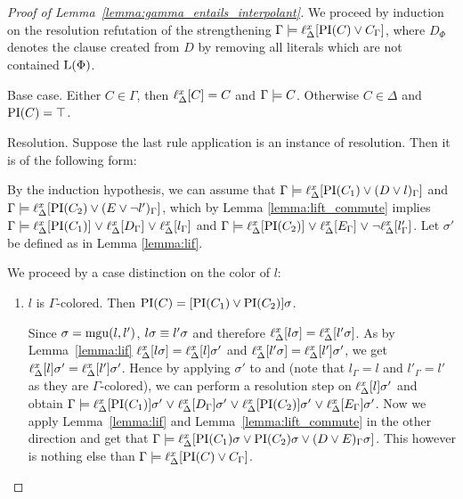 \begin{proof}[Proof of Lemma~\ref{lemma:gamma_entails_interpolant}]
	We proceed by induction on the resolution refutation of the strengthening $\Gamma \entails \lifdelta{\PI(C) \lor\nolinebreak C_\Gamma}$,
	where $D_\Phi$ denotes the clause created from $D$ by removing all literals which are not contained $\operatorname{L}(\Phi)$.

	\begin{description}
		\item{Base case.}
			Either $C \in \Gamma$, then $\ell_{\Delta}^{x}[C] = C$ and $\Gamma \models C$.
			Otherwise $C \in \Delta$ and $\operatorname{PI}(C) = \top$.

		\item{Resolution.}
			Suppose the last rule application is an instance of resolution. Then it is of the following form:
			\begin{prooftree}
			\end{prooftree}

			By the induction hypothesis, we can assume that
			$\Gamma \models \ell_{\Delta}^{x}[\operatorname{PI}(C_1) \lor (D\lor l)_\Gamma]$ and $\Gamma \models \ell_{\Delta}^{x}[\operatorname{PI}(C_2) \lor (E\lor \lnot l')_\Gamma]$,
			which by Lemma \ref{lemma:lift_commute} implies 
			\markA{} $\Gamma \models \ell_{\Delta}^{x}[\operatorname{PI}(C_1)] \;{\lor}\;\allowbreak \ell_{\Delta}^{x}[D_\Gamma] \;{\lor}\;\allowbreak \ell_{\Delta}^{x}[l_\Gamma]$ and \markB{} $\Gamma \models \ell_{\Delta}^{x}[\operatorname{PI}(C_2)] \;{\lor}\; \ell_{\Delta}^{x}[E_\Gamma] \;{\lor}\; \lnot \ell_{\Delta}^{x}[l'_\Gamma]$.
			Let $\sigma'$ be defined as in Lemma \ref{lemma:lif}.

			We proceed by a case distinction on the color of $l$:
			\begin{enumerate}
				\item $l$ is $\Gamma$-colored. Then $\operatorname{PI}(C) = [\operatorname{PI}(C_1) \lor \operatorname{PI}(C_2)]\sigma$.
					
					Since $\sigma = \operatorname{mgu}(l, l')$, $l\sigma \equiv l'\sigma$ and therefore $\ell_{\Delta}^{x}[l\sigma] = \ell_{\Delta}^{x}[l'\sigma]$.
					As by Lemma~\ref{lemma:lif} $\ell_{\Delta}^{x}[l\sigma] = \ell_{\Delta}^{x}[l]\sigma'$ and $\ell_{\Delta}^{x}[l'\sigma] = \ell_{\Delta}^{x}[l']\sigma'$,
					we get $\ell_{\Delta}^{x}[l]\sigma' = \ell_{\Delta}^{x}[l']\sigma'$.\label{aou5jklah}
					Hence by applying $\sigma'$ to \markA{} and \markB{} (note that $l_\Gamma = l$ and $l'_\Gamma = l'$ as they are $\Gamma$-colored), we can perform a resolution step on $\ell_{\Delta}^{x}[l]\sigma'$ and obtain
					$\Gamma \models \ell_{\Delta}^{x}[\operatorname{PI}(C_1)]\sigma' \;{\lor}\; \ell_{\Delta}^{x}[D_\Gamma] \sigma' \;{\lor}\; \ell_{\Delta}^{x}[\operatorname{PI}(C_2)]\sigma' \;{\lor}\; \ell_{\Delta}^{x}[E_\Gamma] \sigma'$.
					Now we apply Lemma~\ref{lemma:lif} and Lemma~\ref{lemma:lift_commute} in the other direction 
					and get that 
					$\Gamma \models \ell_{\Delta}^{x}[\operatorname{PI}(C_1)\sigma \lor \operatorname{PI}(C_2)\sigma \lor\allowbreak (D \lor E)_\Gamma \sigma]$.
					This however is nothing else than 
					$\Gamma \models \ell_{\Delta}^{x}[\operatorname{PI}(C) \lor C_\Gamma]$.


\end{enumerate}
\end{description}
\end{proof}
